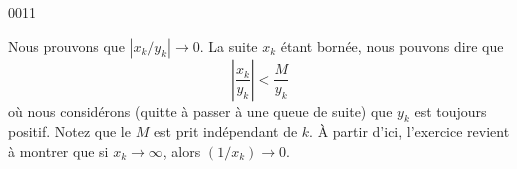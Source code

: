 
\begin{corrige}{0011}


Nous prouvons que $|x_k/y_k|\to 0$. La suite $x_k$ étant bornée, nous pouvons dire que
\begin{equation}
	\left|\frac{ x_k }{ y_k }\right|<\frac{ M }{ y_k }
\end{equation}
où nous considérons (quitte à passer à une queue de suite) que $y_k$ est toujours positif. Notez que le $M$ est prit indépendant de $k$. À partir d'ici, l'exercice revient à montrer que si $x_k\to\infty$, alors $(1/x_k)\to 0$.

\end{corrige}
